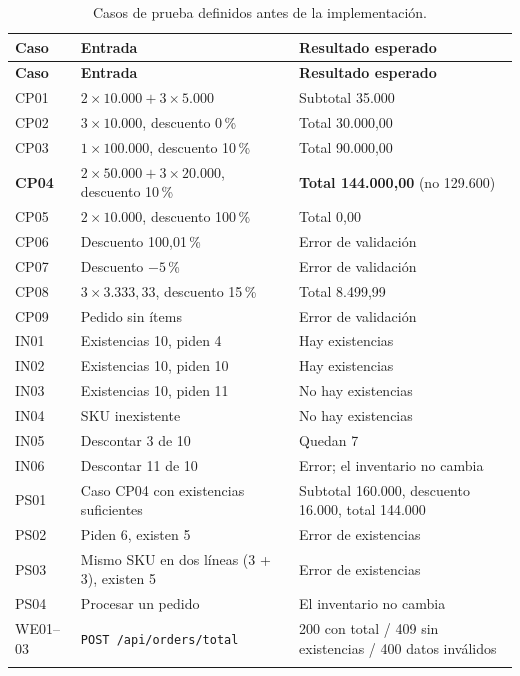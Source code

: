 \documentclass[11pt,a4paper]{article}
\begin{document}
\begin{longtable}{@{}l P{6.6cm} P{5.6cm}@{}}
\toprule
\textbf{Caso} & \textbf{Entrada} & \textbf{Resultado esperado}\\
\midrule
\endfirsthead
\toprule
\textbf{Caso} & \textbf{Entrada} & \textbf{Resultado esperado}\\
\midrule
\endhead
CP01 & $2 \times 10.000 + 3 \times 5.000$ & Subtotal 35.000\\
CP02 & $3 \times 10.000$, descuento 0\,\% & Total 30.000,00\\
CP03 & $1 \times 100.000$, descuento 10\,\% & Total 90.000,00\\
\textbf{CP04} & $2 \times 50.000 + 3 \times 20.000$, descuento 10\,\% & \textbf{Total 144.000,00} (no 129.600)\\
CP05 & $2 \times 10.000$, descuento 100\,\% & Total 0,00\\
CP06 & Descuento 100,01\,\% & Error de validación\\
CP07 & Descuento $-5$\,\% & Error de validación\\
CP08 & $3 \times 3.333{,}33$, descuento 15\,\% & Total 8.499,99\\
CP09 & Pedido sin ítems & Error de validación\\
IN01 & Existencias 10, piden 4 & Hay existencias\\
IN02 & Existencias 10, piden 10 & Hay existencias\\
IN03 & Existencias 10, piden 11 & No hay existencias\\
IN04 & SKU inexistente & No hay existencias\\
IN05 & Descontar 3 de 10 & Quedan 7\\
IN06 & Descontar 11 de 10 & Error; el inventario no cambia\\
PS01 & Caso CP04 con existencias suficientes & Subtotal 160.000, descuento 16.000, total 144.000\\
PS02 & Piden 6, existen 5 & Error de existencias\\
PS03 & Mismo SKU en dos líneas (3 + 3), existen 5 & Error de existencias\\
PS04 & Procesar un pedido & El inventario no cambia\\
WE01--03 & \texttt{POST /api/orders/total} & 200 con total / 409 sin existencias / 400 datos inválidos\\
\bottomrule
\caption{Casos de prueba definidos antes de la implementación.}
\label{tab:casos}
\end{longtable}
\end{document}
